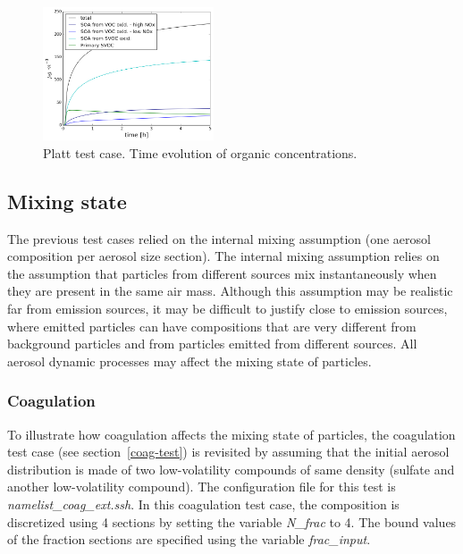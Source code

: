 \documentclass[a4paper,11pt]{article}
\begin{document}
\begin{figure}[H]
        \begin{center}
                \includegraphics[angle=0,width=0.45\textwidth]{../graph/figure_ref/platt-particles.png}
        \end{center}
\caption{Platt test case. Time evolution of organic concentrations.}
\label{fig-platt}
\end{figure}
       
\subsection{Mixing state}
The previous test cases relied on the internal mixing assumption (one aerosol
composition per aerosol size section).
The internal mixing assumption relies on the assumption that particles from different sources
mix instantaneously when they are present in the same air mass. Although this assumption may
be realistic far from emission sources, it may be difficult to justify close to emission sources,
where emitted particles can have compositions that are very different from background particles
and from particles emitted from different sources.
All aerosol dynamic processes may affect the mixing state of particles.

\subsubsection{Coagulation}

To illustrate how coagulation affects the mixing state of particles, the
coagulation test case (see section~\ref{coag-test}) is revisited by assuming
that the initial aerosol distribution is made of two low-volatility compounds
of same density (sulfate and another low-volatility compound).
The configuration file for this test is {\it{namelist\_coag\_ext.ssh}}.
In this coagulation test case, the composition is discretized using 4 sections
by setting the variable {\it{N\_frac}} to 4. The bound values of the fraction
sections are specified using the variable {\it{frac\_input}}.
\end{document}
